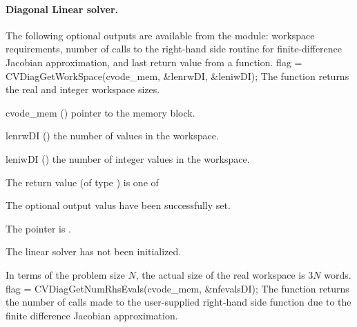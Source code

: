 %
%
\noindent\paragraph{\bf Diagonal Linear solver.}
The following optional outputs are available from the {\cvdiag} module:
workspace requirements, number of calls to the right-hand side routine for 
finite-difference Jacobian approximation, and last return value from a 
{\cvdiag} function.
{
  flag = CVDiagGetWorkSpace(cvode\_mem, \&lenrwDI, \&leniwDI);
}
{
  The function  returns the
  {\cvdiag} real and integer workspace sizes.
}
{
  \begin{args}
  \item[cvode\_mem] ()
    pointer to the {\cvodes} memory block.
  \item[lenrwDI] ()
    the number of  values in the {\cvdiag} workspace.
  \item[leniwDI] ()
    the number of integer values in the {\cvdiag} workspace.
  \end{args}
}
{
  The return value  (of type ) is one of
  \begin{args}
  \item[\Id{CVDIAG\_SUCCESS}] 
    The optional output valus have been successfully set.
  \item[\Id{CVDIAG\_MEM\_NULL}]
    The  pointer is .
  \item[\Id{CVDIAG\_LMEM\_NULL}]
    The {\cvdiag} linear solver has not been initialized.
  \end{args}
}
{
  In terms of the problem size $N$, the actual size of the real workspace
  is $3 N$  words.
}
{
  flag = CVDiagGetNumRhsEvals(cvode\_mem, \&nfevalsDI);
}
{
  The function  returns the
  number of calls made to the user-supplied right-hand side function due to the 
  finite difference Jacobian approximation.
}
